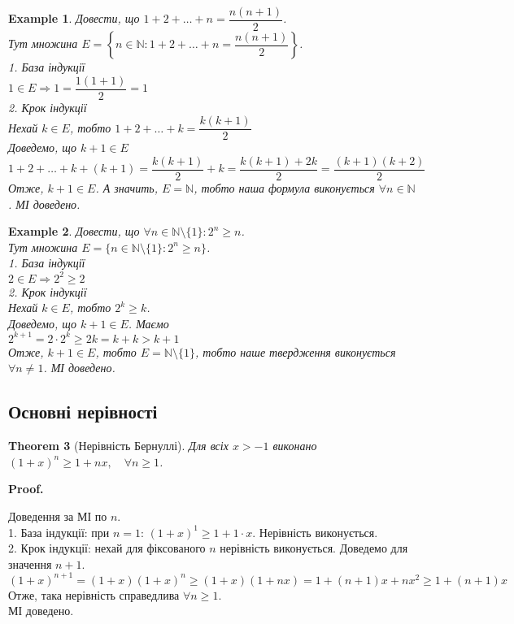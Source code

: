 \documentclass[a4paper, 14pt]{article}
\makeatletter
\def\qed{$\blacksquare$}
\theoremstyle{theoremdd}
\newtheorem{theorem}{Theorem}[subsection]
\theoremstyle{theoremdd}
\theoremstyle{theoremdd}
\theoremstyle{theoremdd}
\newtheorem{example}[theorem]{Example}
\theoremstyle{theoremdd}
\theoremstyle{theoremdd}
\theoremstyle{theoremdd}
\theoremstyle{theoremdd}
\renewenvironment{proof}[1][Proof.\\]{\par
\pushQED{\hfill \qed}%
\normalfont \topsep6\p@\@plus6\p@\relax
\trivlist
\item\relax
{\bfseries
#1\@addpunct{.}}\hspace\labelsep\ignorespaces
}{%
\popQED\endtrivlist\@endpefalse
}
\makeatother
\begin{document}
	\begin{example}
	Довести, що $1 + 2 + \dots + n = \dfrac{n(n+1)}{2}$.\\
	Тут множина $E = \left\{n \in \mathbb{N}: 1 + 2 + \dots + n = \dfrac{n(n+1)}{2} \right\}$.\\
	1. База індукції\\
	$1 \in E \Rightarrow 1 = \dfrac{1(1+1)}{2} = 1$
	\bigskip \\
	2. Крок індукції\\
	Нехай $k \in E$, тобто 
	$1 + 2 + \dots + k = \dfrac{k(k+1)}{2}$\\
	Доведемо, що $k+1 \in E$\\
	$1+ 2 + \dots + k + (k+1) = \dfrac{k(k+1)}{2} + k = \dfrac{k(k+1)+2k}{2} = \dfrac{(k+1)(k+2)}{2}$\\
	Отже, $k+1 \in E$.
	А значить, $E = \mathbb{N}$, тобто наша формула виконується $\forall n \in \mathbb{N}$. МІ доведено.
	\end{example}
	
	\begin{example}
	Довести, що $\forall n \in \mathbb{N} \setminus \{1\}: 2^n \geq n$.\\
	Тут множина $E = \{n \in \mathbb{N} \setminus \{1\}: 2^n \geq n \}$.\\
	1. База індукції\\
	$2 \in E \Rightarrow 2^2 \geq 2$
	\bigskip \\
	2. Крок індукції\\
	Нехай $k \in E$, тобто $2^k \geq k$.\\
	Доведемо, що $k+1 \in E$. Маємо\\
	$2^{k+1} = 2 \cdot 2^k \geq 2k = k + k > k+1$\\
	Отже, $k+1 \in E$, тобто $E = \mathbb{N} \setminus \{1\}$, тобто наше твердження виконується $\forall n \neq 1$. МІ доведено.
	\end{example}
	
	\subsection*{Основні нерівності}
	\begin{theorem}[Нерівність Бернуллі]
	Для всіх $x > -1$ виконано $(1+x)^n \geq 1+nx, \quad \forall n \geq 1$.
	\end{theorem}
	
	\begin{proof}
	Доведення за МІ по $n$.\\
	1. База індукції: при $n=1$: $(1+x)^1 \geq 1+1\cdot x$. Нерівність виконується.\\
	2. Крок індукції: нехай для фіксованого $n$ нерівність виконується. Доведемо для значення $n+1$.\\
	$(1+x)^{n+1}=(1+x)(1+x)^n \geq (1+x)(1+nx)=1+(n+1)x+nx^2 \geq 1+(n+1)x$\\
	Отже, така нерівність справедлива $\forall n \geq 1$. \\
	МІ доведено.
	\end{proof}
	
\end{document}
